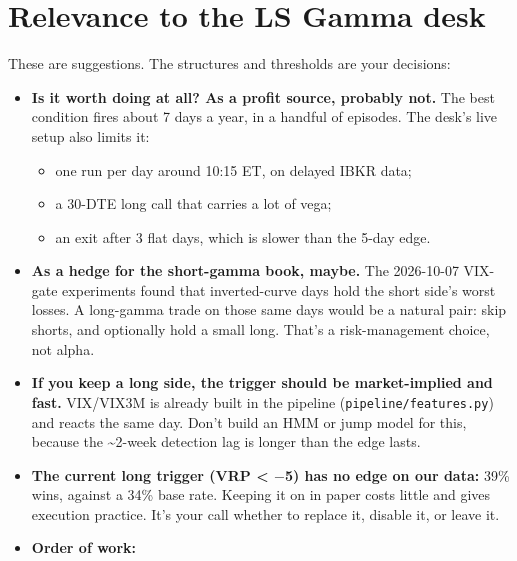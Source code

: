\documentclass{article}
\begin{document}
\section{Relevance to the LS Gamma desk}

These are suggestions. The structures and thresholds are your decisions:

\begin{itemize}

\item \textbf{Is it worth doing at all? As a profit source, probably not.} The best condition fires about 7 days a year, in a handful of episodes. The desk's live setup also limits it:

\begin{itemize}

\item one run per day around 10:15 ET, on delayed IBKR data;

\item a 30-DTE long call that carries a lot of vega;

\item an exit after 3 flat days, which is slower than the 5-day edge.

\end{itemize}

\item \textbf{As a hedge for the short-gamma book, maybe.} The 2026-10-07 VIX-gate experiments found that inverted-curve days hold the short side's worst losses. A long-gamma trade on those same days would be a natural pair: skip shorts, and optionally hold a small long. That's a risk-management choice, not alpha.

\item \textbf{If you keep a long side, the trigger should be market-implied and fast.} VIX/\allowbreak{}VIX3M is already built in the pipeline (\texttt{pipeline/\allowbreak{}features.\allowbreak{}py}) and reacts the same day. Don't build an HMM or jump model for this, because the \textasciitilde{}2-week detection lag is longer than the edge lasts.

\item \textbf{The current long trigger (VRP < \ensuremath{-}5) has no edge on our data:} 39\% wins, against a 34\% base rate. Keeping it on in paper costs little and gives execution practice. It's your call whether to replace it, disable it, or leave it.

\item \textbf{Order of work:}


\end{itemize}
\end{document}
